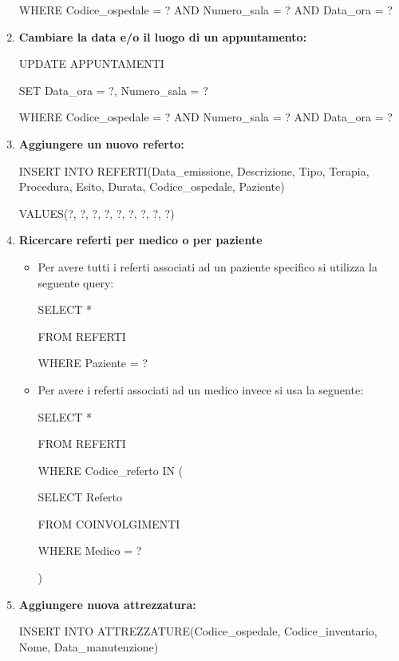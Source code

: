 \documentclass[a4paper,12pt]{report}
\begin{document}
\begin{enumerate}[leftmargin=0cm,itemindent=.5cm,labelwidth=\itemindent,labelsep=0cm,align=left]
    WHERE Codice\_ospedale = ? AND Numero\_sala = ? AND Data\_ora = ?

    \item \textbf{Cambiare la data e/o il luogo di un appuntamento:} \newline
    
    UPDATE APPUNTAMENTI

    SET Data\_ora = ?, Numero\_sala = ?

    WHERE Codice\_ospedale = ? AND Numero\_sala = ? AND Data\_ora = ?

    \item \textbf{Aggiungere un nuovo referto:} \newline
    
    INSERT INTO REFERTI(Data\_emissione, Descrizione, Tipo, Terapia, Procedura, Esito, Durata, Codice\_ospedale, Paziente)
    
    VALUES(?, ?, ?, ?, ?, ?, ?, ?, ?)

    \item \textbf{Ricercare referti per medico o per paziente}
    \begin{itemize}
        \item Per avere tutti i referti associati ad un paziente specifico si utilizza la seguente query:
        
        SELECT *
        
        FROM REFERTI
        
        WHERE Paziente = ?

        \item Per avere i referti associati ad un medico invece si usa la seguente:
        
        SELECT *
       
        FROM REFERTI
       
        WHERE Codice\_referto IN (

            SELECT Referto
            
            FROM COINVOLGIMENTI
            
            WHERE Medico = ?
            
            )
    \end{itemize}
    
    \item \textbf{Aggiungere nuova attrezzatura:} \newline
    
    INSERT INTO ATTREZZATURE(Codice\_ospedale, Codice\_inventario, Nome, Data\_manutenzione)
    

\end{enumerate}
\end{document}
